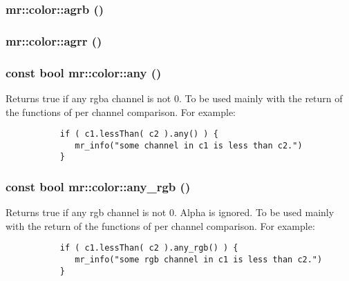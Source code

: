 \subsubsection{ mr::color::agrb ()\hspace{0.3cm}{\tt  [inline]}}\label{structmr_1_1color_z7_191}


\subsubsection{ mr::color::agrr ()\hspace{0.3cm}{\tt  [inline]}}\label{structmr_1_1color_z7_91}


\subsubsection{\setlength{\rightskip}{0pt plus 5cm}const bool mr::color::any ()\hspace{0.3cm}{\tt  [inline]}}\label{structmr_1_1color_z12_4}


Returns true if any rgba channel is not 0. To be used mainly with the return of the functions of per channel comparison. For example: 

\footnotesize\begin{verbatim}           if ( c1.lessThan( c2 ).any() ) {
              mr_info("some channel in c1 is less than c2.")
           }
\end{verbatim}
\normalsize
{}
\subsubsection{\setlength{\rightskip}{0pt plus 5cm}const bool mr::color::any\_\-rgb ()\hspace{0.3cm}{\tt  [inline]}}\label{structmr_1_1color_z12_5}


Returns true if any rgb channel is not 0. Alpha is ignored. To be used mainly with the return of the functions of per channel comparison. For example: 

\footnotesize\begin{verbatim}           if ( c1.lessThan( c2 ).any_rgb() ) {
              mr_info("some rgb channel in c1 is less than c2.")
           }
\end{verbatim}
\normalsize
{}
